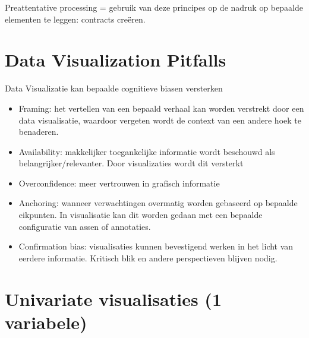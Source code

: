 \documentclass[]{tufte-book}
\providecommand{\tightlist}{%
  \setlength{\itemsep}{0pt}\setlength{\parskip}{0pt}}
\begin{document}
Preattentative processing = gebruik van deze principes op de nadruk op bepaalde elementen te leggen: contracts creëren.

\hypertarget{data-visualization-pitfalls}{%
\section{Data Visualization Pitfalls}\label{data-visualization-pitfalls}}

Data Visualizatie kan bepaalde cognitieve biasen versterken

\begin{itemize}
\tightlist
\item
  Framing: het vertellen van een bepaald verhaal kan worden verstrekt door een data visualisatie, waardoor vergeten wordt de context van een andere hoek te benaderen.
\item
  Availability: makkelijker toegankelijke informatie wordt beschouwd als belangrijker/relevanter. Door visualizaties wordt dit versterkt
\item
  Overconfidence: meer vertrouwen in grafisch informatie
\item
  Anchoring: wanneer verwachtingen overmatig worden gebaseerd op bepaalde eikpunten. In visualisatie kan dit worden gedaan met een bepaalde configuratie van assen of annotaties.
\item
  Confirmation bias: visualisaties kunnen bevestigend werken in het licht van eerdere informatie. Kritisch blik en andere perspectieven blijven nodig.
\end{itemize}

\hypertarget{univariate-visualisaties-1-variabele}{%
\section{Univariate visualisaties (1 variabele)}\label{univariate-visualisaties-1-variabele}}
\end{document}
